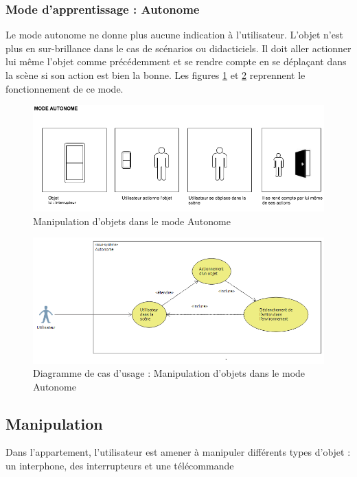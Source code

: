 \subsubsection{Mode d'apprentissage : Autonome}

Le mode autonome ne donne plus aucune indication à l'utilisateur. L'objet n'est plus en sur-brillance dans le cas de scénarios ou didacticiels. Il doit aller actionner lui même l'objet comme précédemment et se rendre compte en se déplaçant dans la scène si son action est bien la bonne. 
\newline
Les figures \ref{fig:MaquetteAutonome} et \ref{fig:CasUsageAutonome} reprennent le fonctionnement de ce mode.

\begin{figure}[h]
\centering
\includegraphics[width=1\textwidth]{2-Specifications/img-utilisateur/autonome.png}
\caption{\label{fig:MaquetteAutonome} Manipulation d'objets dans le mode Autonome }
\end{figure}
\begin{figure}[h]
\centering
\includegraphics[width=1\textwidth]{2-Specifications/img-utilisateur/cas-usage-autonome.png}
\caption{\label{fig:CasUsageAutonome} Diagramme de cas d'usage : Manipulation d'objets dans le mode Autonome }
\end{figure}
\FloatBarrier 



\subsection{Manipulation}
Dans l’appartement, l’utilisateur est amener à manipuler différents types d’objet : un interphone, des interrupteurs et une télécommande

